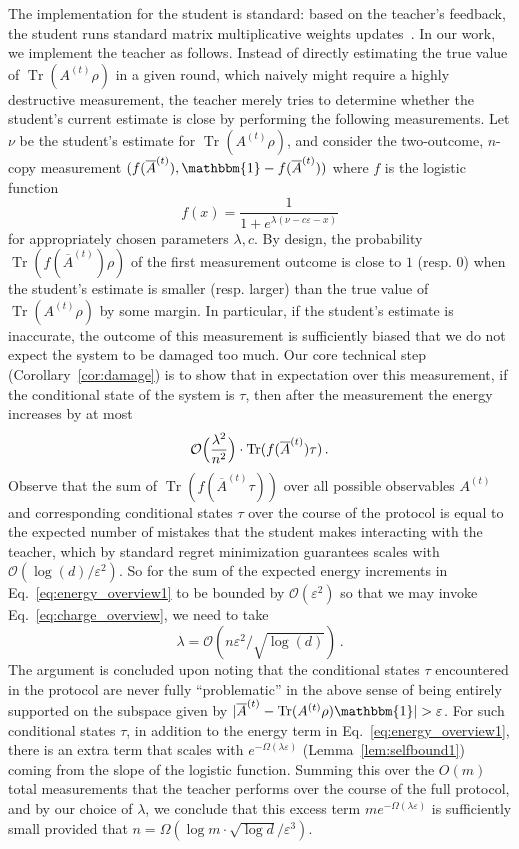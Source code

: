 \documentclass[10pt]{article}
\renewcommand{\epsilon}{\varepsilon}
\DeclareMathOperator{\Tr}{Tr}
\newcommand{\Id}{\mathbbm{1}}
\begin{document}
The implementation for the student is standard: based on the teacher's feedback, the student runs standard matrix multiplicative weights updates~\cite{ACH+19}. In our work, we implement the teacher as follows. Instead of directly estimating the true value of $\Tr(A^{(t)}\rho)$ in a given round, which naively might require a highly destructive measurement, the teacher merely tries to determine whether the student's current estimate is close by performing the following measurements. Let $\nu$ be the student's estimate for $\Tr(A^{(t)}\rho)$, and consider the two-outcome, $n$-copy measurement $(f(\overline{A}^{(t)}), \Id - f(\overline{A}^{(t)}))$ where $f$ is the logistic function
\begin{equation}
    f(x) = \frac{1}{1 + e^{\lambda(\nu - c\epsilon - x)}}
\end{equation}
for appropriately chosen parameters $\lambda, c$.
By design, the probability $\Tr(f(\overline{A}^{(t)})\rho)$ of the first measurement outcome is close to $1$ (resp. $0$) when the student's estimate is smaller (resp. larger) than the true value of $\Tr(A^{(t)}\rho)$ by some margin. In particular, if the student's estimate is inaccurate, the outcome of this measurement is sufficiently biased that we do not expect the system to be damaged too much. Our core technical step (Corollary~\ref{cor:damage}) is to show that in expectation over this measurement, if the conditional state of the system is $\tau$, then after the measurement the energy increases by at most 
\begin{equation}
    \mathcal{O}\Bigl(\frac{\lambda^2}{n^2}\Bigr)\cdot \Tr(f(\overline{A}^{(t)})\tau)\,. \label{eq:energy_overview1}
\end{equation}
Observe that the sum of $\Tr(f(\overline{A}^{(t)}\tau))$ over all possible observables $A^{(t)}$ and corresponding conditional states $\tau$ over the course of the protocol is equal to the expected number of mistakes that the student makes interacting with the teacher, which by standard regret minimization guarantees scales with $\mathcal{O}(\log(d)/\epsilon^2)$. So for the sum of the expected energy increments in Eq.~\eqref{eq:energy_overview1} to be bounded by $\mathcal{O}(\epsilon^2)$ so that we may invoke Eq.~\eqref{eq:charge_overview}, we need to take 
\begin{equation}
    \lambda = \mathcal{O}(n\epsilon^2/\sqrt{\log(d)})\,.
\end{equation}
The argument is concluded upon noting that the conditional states $\tau$ encountered in the protocol are never fully ``problematic'' in the above sense of being entirely supported on the subspace given by $|\overline{A}^{(t)} - \Tr(A^{(t)}\rho)\Id| > \epsilon$. For such conditional states $\tau$, in addition to the energy term in Eq.~\eqref{eq:energy_overview1}, there is an extra term that scales with $e^{-\Omega(\lambda\epsilon)}$ (Lemma~\ref{lem:selfbound1}) coming from the slope of the logistic function. Summing this over the $O(m)$ total measurements that the teacher performs over the course of the full protocol, and by our choice of $\lambda$, we conclude that this excess term $me^{-\Omega(\lambda\epsilon)}$ is sufficiently small provided that $n = \Omega(\log m\cdot \sqrt{\log d} / \epsilon^3)$.
\end{document}
